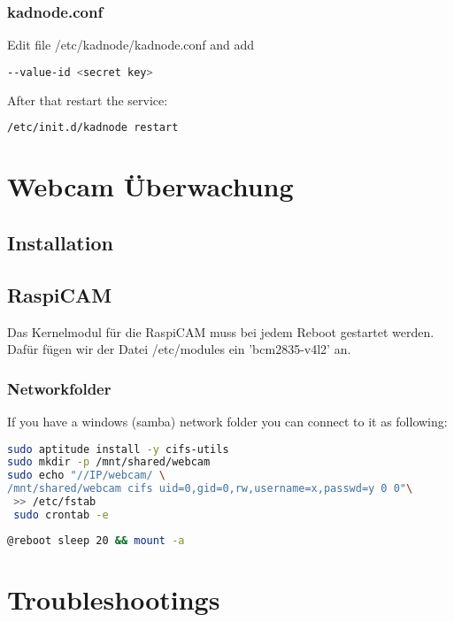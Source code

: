 \documentclass[a4paper,11pt]{report}
\begin{document}
\subsection{kadnode.conf}

Edit file /etc/kadnode/kadnode.conf and add
\begin{lstlisting}[language=bash,caption={/etc/kadnode/kadnode.conf}]
--value-id <secret key>
\end{lstlisting}
After that restart the service:
\begin{lstlisting}[language=bash,caption={}]
/etc/init.d/kadnode restart
\end{lstlisting}

\chapter{Webcam Überwachung}
\section{Installation}
\section{RaspiCAM}
Das Kernelmodul für die RaspiCAM muss bei jedem Reboot gestartet werden.
Dafür fügen wir der Datei /etc/modules ein 'bcm2835-v4l2' an.

\subsection{Networkfolder}
If you have a windows (samba) network folder you can connect to it as following:
\begin{lstlisting}[language=bash,caption={}]
sudo aptitude install -y cifs-utils
sudo mkdir -p /mnt/shared/webcam
sudo echo "//IP/webcam/ \
/mnt/shared/webcam cifs uid=0,gid=0,rw,username=x,passwd=y 0 0"\
 >> /etc/fstab
 sudo crontab -e
\end{lstlisting}
\begin{lstlisting}[language=bash,caption={cronjob}]
@reboot	sleep 20 && mount -a
\end{lstlisting}

\chapter{Troubleshootings}
\end{document}
